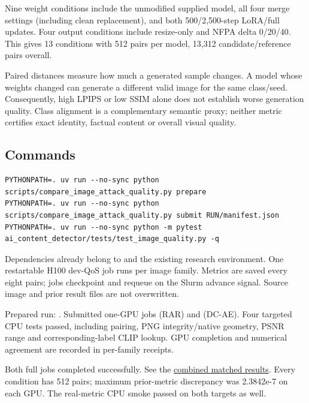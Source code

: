 Nine weight conditions include the unmodified supplied model, all four
merge settings (including clean replacement), and both 500/2,500-step
LoRA/full updates. Four output conditions include resize-only and NFPA
delta 0/20/40. This gives 13 conditions with 512 pairs per model, 13,312
candidate/reference pairs overall.

Paired distances measure how much a generated sample changes. A model
whose weights changed can generate a different valid image for the same
class/seed. Consequently, high LPIPS or low SSIM alone does not
establish worse generation quality. Class alignment is a complementary
semantic proxy; neither metric certifies exact identity, factual content
or overall visual quality.

\subsection{Commands}\label{record-docs-matched-image-quality-md-commands}

\begin{Verbatim}
PYTHONPATH=. uv run --no-sync python scripts/compare_image_attack_quality.py prepare
PYTHONPATH=. uv run --no-sync python scripts/compare_image_attack_quality.py submit RUN/manifest.json
PYTHONPATH=. uv run --no-sync python -m pytest ai_content_detector/tests/test_image_quality.py -q
\end{Verbatim}

Dependencies already belong to
\texttt{} and the existing
research environment. One restartable H100 dev-QoS job runs per image
family. Metrics are saved every eight pairs; jobs checkpoint and requeue
on the Slurm advance signal. Source image and prior result files are not
overwritten.

Prepared run: \texttt{}. Submitted
one-GPU jobs \texttt{} (RAR) and
\texttt{} (DC-AE). Four targeted CPU tests passed,
including pairing, PNG integrity/native geometry, PSNR range and
corresponding-label CLIP lookup. GPU completion and numerical agreement
are recorded in per-family receipts.

Both full jobs completed successfully. See the
\href{records/docs/matched_image_quality_results.tex}{combined matched
results}. Every condition has 512 pairs; maximum prior-metric
discrepancy was 2.3842e-7 on each GPU. The real-metric CPU smoke passed
on both targets as well.
